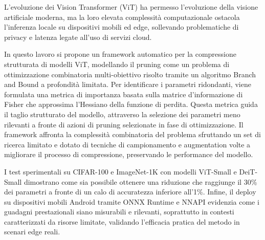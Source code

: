 L'evoluzione dei Vision Transformer (ViT) ha permesso l'evoluzione della visione artificiale moderna, ma la loro elevata complessità computazionale ostacola l'inferenza locale su dispositivi mobili ed edge, sollevando problematiche di privacy e latenza legate all'uso di servizi cloud. \par

In questo lavoro si propone un framework automatico per la compressione strutturata di modelli ViT, modellando il pruning come un problema di ottimizzazione combinatoria multi-obiettivo risolto tramite un algoritmo Branch and Bound a profondità limitata. Per identificare i parametri ridondanti, viene formulata una metrica di importanza basata sulla matrice d'informazione di Fisher che approssima l'Hessiano della funzione di perdita. Questa metrica guida il taglio strutturato del modello, attraverso la selezione dei parametri meno rilevanti a fronte di azioni di pruning selezionate in fase di ottimizzazione. Il framework affronta la complessità combinatoria del problema sfruttando un set di ricerca limitato e dotato di tecniche di campionamento e augmentation volte a migliorare il processo di compressione, preservando le performance del modello. \par

I test sperimentali su CIFAR-100 e ImageNet-1K con modelli ViT-Small e DeiT-Small dimostrano come sia possibile ottenere una riduzione che raggiunge il 30\% dei parametri a fronte di un calo di accuratezza inferiore all'1\%. Infine, il deploy su dispositivi mobili Android tramite ONNX Runtime e NNAPI evidenzia come i guadagni prestazionali siano misurabili e rilevanti, soprattutto in contesti caratterizzati da risorse limitate, validando l'efficacia pratica del metodo in scenari edge reali.